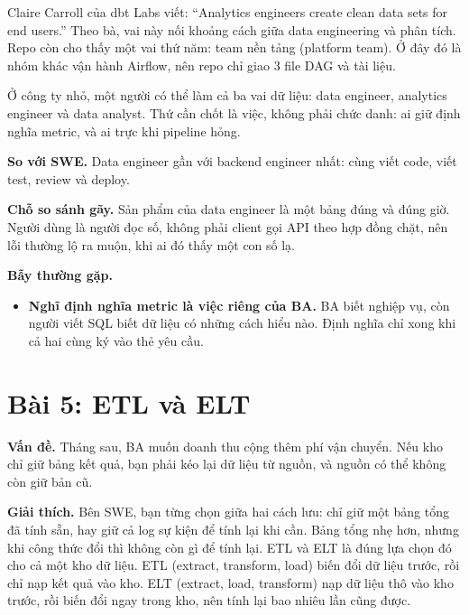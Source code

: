 Claire Carroll của dbt Labs viết: ``Analytics engineers create clean data sets for end users.'' Theo bà, vai này nối khoảng cách giữa data engineering và phân tích. Repo còn cho thấy một vai thứ năm: team nền tảng (platform team). Ở đây đó là nhóm khác vận hành Airflow, nên repo chỉ giao 3 file DAG và tài liệu.

Ở công ty nhỏ, một người có thể làm cả ba vai dữ liệu: data engineer, analytics engineer và data analyst. Thứ cần chốt là việc, không phải chức danh: ai giữ định nghĩa metric, và ai trực khi pipeline hỏng.

\begin{ghichu}
\textbf{So với SWE.} Data engineer gần với backend engineer nhất: cùng viết code, viết test, review và deploy.

\textbf{Chỗ so sánh gãy.} Sản phẩm của data engineer là một bảng đúng và đúng giờ. Người dùng là người đọc số, không phải client gọi API theo hợp đồng chặt, nên lỗi thường lộ ra muộn, khi ai đó thấy một con số lạ.
\end{ghichu}

\begin{luuy}
\textbf{Bẫy thường gặp.}
\begin{itemize}
  \item \textbf{Nghĩ định nghĩa metric là việc riêng của BA.} BA biết nghiệp vụ, còn người viết SQL biết dữ liệu có những cách hiểu nào. Định nghĩa chỉ xong khi cả hai cùng ký vào thẻ yêu cầu.
\end{itemize}
\end{luuy}

\section{Bài 5: ETL và ELT}

\textbf{Vấn đề.} Tháng sau, BA muốn doanh thu cộng thêm phí vận chuyển. Nếu kho chỉ giữ bảng kết quả, bạn phải kéo lại dữ liệu từ nguồn, và nguồn có thể không còn giữ bản cũ.

\textbf{Giải thích.} Bên SWE, bạn từng chọn giữa hai cách lưu: chỉ giữ một bảng tổng đã tính sẵn, hay giữ cả log sự kiện để tính lại khi cần. Bảng tổng nhẹ hơn, nhưng khi công thức đổi thì không còn gì để tính lại. ETL và ELT là đúng lựa chọn đó cho cả một kho dữ liệu. ETL (extract, transform, load) biến đổi dữ liệu trước, rồi chỉ nạp kết quả vào kho. ELT (extract, load, transform) nạp dữ liệu thô vào kho trước, rồi biến đổi ngay trong kho, nên tính lại bao nhiêu lần cũng được.

